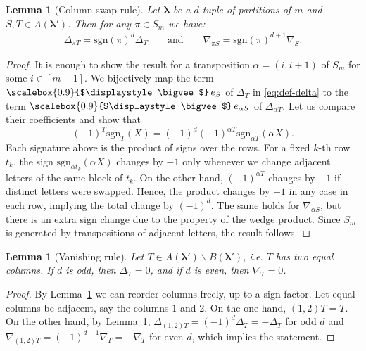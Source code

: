 \documentclass[12pt, reqno]{amsart}
\newtheorem{lemma}[theorem]{Lemma}
\theoremstyle{definition}
\newcommand{\sgn}{\mathrm{sgn}}
\let\oldbigvee\bigvee
\renewcommand{\bigvee}{
  \mathop{
    \vcenter{
      \hbox{\scalebox{0.9}{$\displaystyle\oldbigvee$}}
    }
  }
}
\begin{document}
\begin{lemma}[Column swap rule]\label{lemma:colswap}
    Let $\pmb{\lambda}$ be a $d$-tuple of partitions of $m$ and $S, T \in A(\pmb{\lambda'})$. Then for any $\pi \in S_m$ we have:
    \begin{align*}
        \Delta_{\pi T} = \sgn(\pi)^d\Delta_T \qquad\text{and}\qquad \nabla_{\pi S} = \sgn(\pi)^{d+1}\nabla_S.
    \end{align*}
\end{lemma}
\begin{proof}
    It is enough to show the result for a transposition $\alpha=(i,i+1)$ of $S_m$ for some $i\in[m-1]$. We bijectively map the term $\bigvee e_S$ of $\Delta_T$ in \eqref{eq:def-delta} to the term $\bigvee e_{\alpha S}$ of $\Delta_{\alpha T}$. Let us compare their coefficients and show that 
    $$
        (-1)^T\sgn_{T}(X) = (-1)^d(-1)^{\alpha T}\sgn_{\alpha T}(\alpha X).
    $$ 
    Each signature above is the product of signs over the rows.
    For a fixed $k$-th row $t_k$, the sign $\sgn_{\alpha t_k}(\alpha X)$ changes by $-1$ only whenever we change adjacent letters of the same block of $t_k$. On the other hand, $(-1)^{\alpha T}$ changes by $-1$ if distinct letters were swapped. Hence, the product changes by $-1$ in any case in each row, implying the total change by $(-1)^d$. The same holds for $\nabla_{\alpha S}$, but there is an extra sign change due to the property of the wedge product. Since $S_m$ is generated by transpositions of adjacent letters, the result follows.
\end{proof}

\begin{lemma}[Vanishing rule]\label{lemma:vanish}
    Let $T \in A(\pmb{\lambda'}) \backslash B(\pmb{\lambda'})$, i.e. $T$ has two equal columns. If $d$ is odd, then $\Delta_T = 0$, and if $d$ is even, then $\nabla_T = 0$.
\end{lemma}
\begin{proof}
    By Lemma~\ref{lemma:colswap} we can reorder columns freely, up to a sign factor. Let equal columns be adjacent, say the columns $1$ and $2$. On the one hand, $(1,2)T = T$. 
    On the other hand, by Lemma~\ref{lemma:colswap}, $\Delta_{(1,2)T} = (-1)^{d} \Delta_T = -\Delta_T$ for odd $d$ and $\nabla_{(1,2)T} = (-1)^{d+1} \nabla_T = -\nabla_T$ for even $d$, which implies the statement.
\end{proof}
\end{document}
